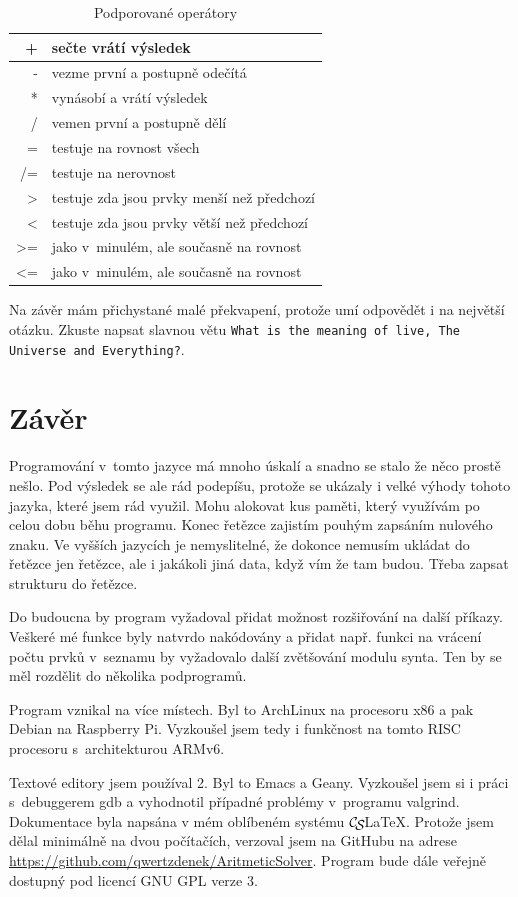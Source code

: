 \documentclass[a4paper, 12pt]{article}
\def\CS{$\cal C\kern-.1667em\lower.5ex\hbox{$\cal S$}\kern-.075em $}
\begin{document}
\begin{table}
\centering
\begin{tabular}{|r|l|}
\hline
+ & sečte vrátí výsledek\\ \hline
- & vezme první a postupně odečítá\\ \hline
* & vynásobí a vrátí výsledek\\ \hline
/ & vemen první a postupně dělí\\ \hline
= & testuje na rovnost všech\\ \hline
/= & testuje na nerovnost\\ \hline
\textgreater{} & testuje zda jsou prvky menší než předchozí\\ \hline
\textless{} & testuje zda jsou prvky větší než předchozí\\ \hline
\textgreater{=} & jako v~minulém, ale současně na rovnost\\ \hline
\textless{=} & jako v~minulém, ale současně na rovnost\\ \hline
\end{tabular}
\caption{Podporované operátory}
\label{tab:op}
\end{table}

Na závěr mám přichystané malé překvapení, protože umí odpovědět i
na největší otázku. Zkuste napsat slavnou větu \texttt{What is the
meaning of live, The Universe and Everything?}.

\section{Závěr}
Programování v~tomto jazyce má mnoho úskalí a snadno se stalo že něco
prostě nešlo. Pod výsledek se ale rád podepíšu, protože se ukázaly i velké
výhody tohoto jazyka, které jsem rád využil. Mohu alokovat kus paměti,
který využívám po celou dobu běhu programu. Konec řetězce zajistím pouhým
zapsáním nulového znaku. Ve vyšších jazycích je nemyslitelné, že dokonce
nemusím ukládat do řetězce jen řetězce, ale i jakákoli jiná data, když vím
že tam budou. Třeba zapsat strukturu do řetězce.

Do budoucna by program vyžadoval přidat možnost rozšiřování na další
příkazy. Veškeré mé funkce byly natvrdo nakódovány a přidat např.
funkci na vrácení počtu prvků v~seznamu by vyžadovalo další zvětšování
modulu \textsf{synta}. Ten by se měl rozdělit do několika podprogramů.

Program vznikal na více místech. Byl to ArchLinux na procesoru x86 a
pak Debian na Raspberry Pi. Vyzkoušel jsem tedy i funkčnost na tomto
RISC procesoru s~architekturou ARMv6.

Textové editory jsem používal 2. Byl to Emacs a Geany. Vyzkoušel jsem si i
práci s~debuggerem \textsf{gdb} a vyhodnotil případné problémy v~programu
\textsf{valgrind}. Dokumentace byla napsána v mém oblíbeném systému
\CS\LaTeX{}. Protože jsem dělal minimálně na dvou počítačích, verzoval jsem
na GitHubu na adrese
\url{https://github.com/qwertzdenek/AritmeticSolver}. Program bude dále
veřejně dostupný pod licencí GNU GPL verze 3.

\nocite{wiki:cpro}
\nocite{pred:c}

\end{document}
